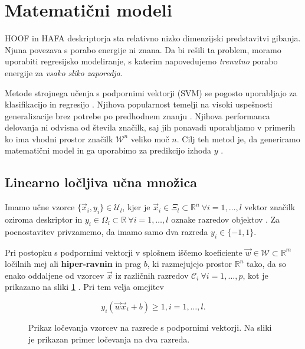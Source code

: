\section{Matematični modeli}\label{sec:matematicni-modeli}
HOOF in HAFA deskriptorja sta relativno nizko dimenzijski predstavitvi gibanja. Njuna povezava s porabo energije ni znana. Da bi rešili ta problem, moramo uporabiti regresijsko modeliranje, s katerim napovedujemo \emph{trenutno} porabo energije za \emph{vsako sliko zaporedja}.

Metode strojnega učenja s podpornimi vektorji (SVM) se pogosto uporabljajo za klasifikacijo in regresijo \cite{chang2011a}. Njihova popularnost temelji na visoki uspešnosti generalizacije brez potrebe po predhodnem znanju \cite{chapelle1999support}. Njihova performanca delovanja ni odvisna od števila značilk, saj jih ponavadi uporabljamo v primerih ko ima vhodni prostor značilk $\mathcal{W}^n$ veliko moč $n$. Cilj teh metod je, da generiramo matematični model in ga uporabimo za predikcijo izhoda $y$ \cite{hsu2003practical}. 






\subsection{Linearno ločljiva učna množica}
Imamo učne vzorce $\{ \vec{x}_i, y_i \} \in \mathcal{U}_l$, kjer je $\vec{x}_i \in \mathcal{\Xi}_l \subset \mathbb{R}^n~\forall i = 1, \ldots, l$ vektor značilk oziroma deskriptor in $y_i \in \mathit{\Omega}_l \subset \mathbb{R}~\forall i = 1, \ldots, l$ oznake razredov objektov \cite{chapelle1999support}. Za poenostavitev privzamemo, da imamo samo dva razreda $y_i \in \{-1,1\}$. 

Pri postopku s podpornimi vektorji v splošnem iščemo koeficiente $\vec{w} \in \mathcal{W} \subset \mathbb{R}^m$ ločilnih mej ali \textbf{hiper-ravnin} in prag $b$, ki razmejujejo prostor $\mathbb{R}^n$ tako, da so enako oddaljene od vzorcev $\vec{x}$ iz različnih razredov $\mathcal{C}_i~\forall i= 1, \ldots, p$, kot je prikazano na sliki \ref{fig:svm-locljivo} \cite{chapelle1999support}. Pri tem velja omejitev

\begin{equation}\label{eq:omejitev-ravnine}
	y_i(\vec{w} \vec{x}_i + b) \geq 1, i=1, \ldots, l.
\end{equation}





\begin{figure}[htb]
\centering

\caption[Prikaz ločevanja vzorcev na razrede s podpornimi vektorji]{Prikaz ločevanja vzorcev na razrede s podpornimi vektorji. Na sliki je prikazan primer ločevanja na dva razreda.}
\label{fig:svm-locljivo}
\end{figure}




